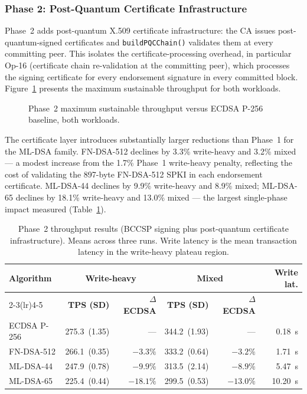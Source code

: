 \documentclass{ieeetj}
\begin{document}
\subsubsection{Phase 2: Post-Quantum Certificate Infrastructure}

Phase~2 adds post-quantum X.509 certificate infrastructure: the CA issues
post-quantum-signed certificates and \texttt{buildPQCChain()} validates them at
every committing peer. This isolates the certificate-processing overhead, in
particular Op-16 (certificate chain re-validation at the committing peer), which
processes the signing certificate for every endorsement signature in every
committed block. Figure~\ref{fig:phase2_throughput} presents the maximum
sustainable throughput for both workloads.

\begin{figure}[ht]
\centering

\caption{Phase~2 maximum sustainable throughput versus ECDSA P-256 baseline, both workloads.}
\label{fig:phase2_throughput}
\end{figure}

The certificate layer introduces substantially larger reductions than Phase~1 for
the ML-DSA family. FN-DSA-512 declines by 3.3\% write-heavy and 3.2\% mixed ---
a modest increase from the 1.7\% Phase~1 write-heavy penalty, reflecting the cost
of validating the 897-byte FN-DSA-512 SPKI in each endorsement certificate.
ML-DSA-44 declines by 9.9\% write-heavy and 8.9\% mixed; ML-DSA-65 declines by
18.1\% write-heavy and 13.0\% mixed --- the largest single-phase impact measured
(Table~\ref{tab:phase2_results}).

\begin{table}[ht]
\centering
\caption{Phase~2 throughput results (BCCSP signing plus post-quantum certificate
infrastructure). Means across three runs. Write latency is the mean transaction
latency in the write-heavy plateau region.}
\label{tab:phase2_results}
\setlength{\tabcolsep}{3.0pt}
\begin{tabular}{@{}lrrrrr@{}}
\toprule
\textbf{Algorithm} &
\multicolumn{2}{c}{\textbf{Write-heavy}} &
\multicolumn{2}{c}{\textbf{Mixed}} &
\textbf{Write lat.} \\
\cmidrule(lr){2-3}\cmidrule(lr){4-5}
& \textbf{TPS (SD)} & \textbf{$\Delta$ ECDSA} &
  \textbf{TPS (SD)} & \textbf{$\Delta$ ECDSA} & \\
\midrule
ECDSA P-256 & 275.3~(1.35) & — & 344.2~(1.93) & — & 0.18~s \\
FN-DSA-512  & 266.1~(0.35) & $-3.3\%$ & 333.2~(0.64) & $-3.2\%$ & 1.71~s \\
ML-DSA-44   & 247.9~(0.78) & $-9.9\%$ & 313.5~(2.14) & $-8.9\%$ & 5.47~s \\
ML-DSA-65   & 225.4~(0.44) & $-18.1\%$ & 299.5~(0.53) & $-13.0\%$ & 10.20~s \\
\bottomrule
\end{tabular}
\end{table}
\end{document}
